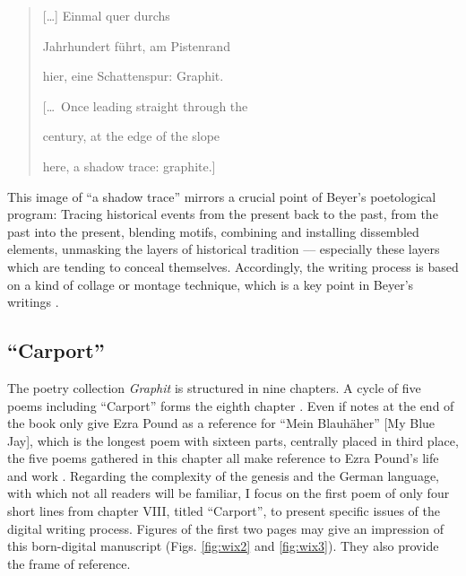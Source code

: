 \begin{paper}
\begin{quote}
{[}\ldots{]} Einmal quer durchs

Jahrhundert führt, am Pistenrand

hier, eine Schattenspur: Graphit. 

\vspace{1em}
 
{[}\ldots~Once leading straight through the

century, at the edge of the slope

here, a shadow trace: graphite.{]}

\begin{flushright}
    \parencite[17]{beyer_graphit_2014}
\end{flushright} 
\end{quote}

This image of ``a shadow trace'' mirrors a crucial point of Beyer's
poetological program: Tracing historical events from the present back to
the past, from the past into the present, blending motifs,
combining and installing dissembled elements, unmasking the layers of
historical tradition –– especially these layers which are tending to
conceal themselves. Accordingly, the writing process is based on a kind of collage or
montage technique, which is a key point in Beyer's writings \citep{wix_editionsphilologie_2017, wix_genese_2019}.

\subsection*{``Carport''}

The poetry collection \emph{Graphit} is structured in nine chapters. A
cycle of five poems including ``Carport'' forms the eighth chapter
\citep[171--192]{beyer_graphit_2014}. Even if notes at the end of the book only give
Ezra Pound as a reference for ``Mein Blauhäher'' [My Blue Jay], which is
the longest poem with sixteen parts, centrally placed in third place,
the five poems gathered in this chapter all make reference to Ezra
Pound's life and work \citep[67]{mengeringhaus_was_nodate}. Regarding the complexity
of the genesis and the German language, with which not all readers will
be familiar, I focus on the first poem of only four short lines from
chapter VIII, titled ``Carport'', to present specific issues of the
digital writing process. Figures of the first two pages may give an
impression of this born-digital manuscript (Figs. \ref{fig:wix2} and  \ref{fig:wix3}). They also
provide the frame of reference.


\end{paper}
